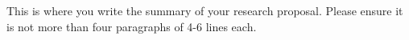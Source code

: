 This is where you write the summary of your research proposal. Please ensure it is not more than four paragraphs of 4-6 lines each.
